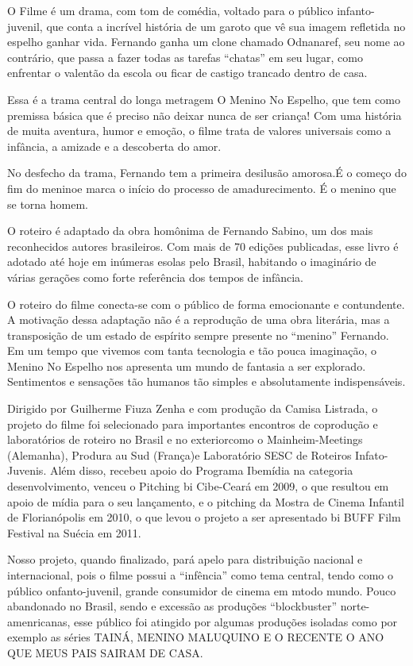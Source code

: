 O Filme é um drama, com tom de comédia, voltado para o público infanto-juvenil, que conta a incrível história de um garoto que vê sua imagem refletida no espelho ganhar vida. Fernando ganha um clone chamado Odnanaref, seu nome ao contrário, que passa a fazer todas as tarefas “chatas” em seu lugar, como enfrentar o valentão da escola ou ficar de castigo trancado dentro de casa.

Essa é a trama central do longa metragem O Menino No Espelho, que tem como premissa básica que é preciso não deixar nunca de ser criança! Com uma história de muita aventura, humor e emoção, o filme trata de valores universais como a infância, a amizade e a descoberta do amor.

No desfecho da trama, Fernando tem a primeira desilusão amorosa.É o começo do fim do meninoe marca o início do processo de amadurecimento. É o menino que se torna homem.

O roteiro é adaptado da obra homônima de Fernando Sabino, um dos mais reconhecidos autores brasileiros. Com mais de 70 edições publicadas, esse livro é adotado até hoje em inúmeras esolas pelo Brasil, habitando o imaginário de várias gerações como forte referência dos tempos de infância.

O roteiro do filme conecta-se com o público de forma emocionante e contundente. A motivação dessa adaptação não é a reprodução de uma obra literária, mas a transposição de um estado de espírito sempre presente no “menino” Fernando. Em um tempo que vivemos com tanta tecnologia e tão pouca imaginação, o Menino No Espelho nos apresenta um mundo de fantasia a ser explorado. Sentimentos e sensações tão humanos tão simples e absolutamente indispensáveis.

Dirigido por Guilherme Fiuza Zenha e com produção da Camisa Listrada, o projeto do filme foi selecionado para importantes encontros de coprodução e laboratórios de roteiro no Brasil e no exteriorcomo o Mainheim-Meetings (Alemanha), Produra au Sud (França)e Laboratório SESC de Roteiros Infato-Juvenis. Além disso, recebeu apoio do Programa Ibemídia na categoria desenvolvimento, venceu o Pitching bi Cibe-Ceará em 2009, o que resultou em apoio de mídia para o seu lançamento, e o pitching da Mostra de Cinema Infantil de Florianópolis em 2010, o que levou o projeto a ser apresentado bi BUFF Film Festival na Suécia em 2011.

Nosso projeto, quando finalizado, pará apelo para distribuição nacional e internacional, pois o filme possui a “infência” como tema central, tendo como o público onfanto-juvenil, grande consumidor de cinema em mtodo mundo. Pouco abandonado no Brasil, sendo e excessão as produções “blockbuster” norte-amenricanas, esse público foi atingido por algumas produções isoladas como por exemplo as séries TAINÁ, MENINO MALUQUINO E O RECENTE O ANO QUE MEUS PAIS SAIRAM DE CASA.

